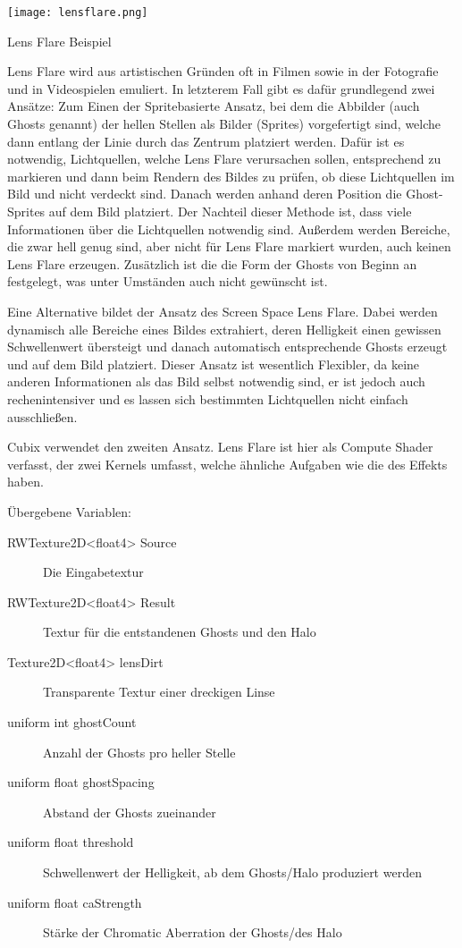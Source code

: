 \texttt{[image: lensflare.png]}
\caption{Lens Flare Beispiel}
\label{img:lensFlareImg}

Lens Flare wird aus artistischen Gründen oft in Filmen sowie in der Fotografie und in Videospielen emuliert. In letzterem Fall gibt es dafür grundlegend zwei Ansätze: Zum Einen der Spritebasierte Ansatz, bei dem die Abbilder (auch Ghosts genannt) der hellen Stellen als Bilder (Sprites) vorgefertigt sind, welche dann entlang der Linie durch das Zentrum platziert werden. Dafür ist es notwendig, Lichtquellen, welche Lens Flare verursachen sollen, entsprechend zu markieren und dann beim Rendern des Bildes zu prüfen, ob diese Lichtquellen im Bild und nicht verdeckt sind. Danach werden anhand deren Position die Ghost-Sprites auf dem Bild platziert. Der Nachteil dieser Methode ist, dass viele Informationen über die Lichtquellen notwendig sind. Au{\ss}erdem werden Bereiche, die zwar hell genug sind, aber nicht für Lens Flare markiert wurden, auch keinen Lens Flare erzeugen. Zusätzlich ist die die Form der Ghosts von Beginn an festgelegt, was unter Umständen auch nicht gewünscht ist.

Eine Alternative bildet der Ansatz des Screen Space Lens Flare. Dabei werden dynamisch alle Bereiche eines Bildes extrahiert, deren Helligkeit einen gewissen Schwellenwert übersteigt und danach automatisch entsprechende Ghosts erzeugt und auf dem Bild platziert. Dieser Ansatz ist wesentlich Flexibler, da keine anderen Informationen als das Bild selbst notwendig sind, er ist jedoch auch rechenintensiver und es lassen sich bestimmten Lichtquellen nicht einfach ausschlie{\ss}en.

Cubix verwendet den zweiten Ansatz. Lens Flare ist hier als Compute Shader verfasst, der zwei Kernels umfasst, welche ähnliche Aufgaben wie die des  Effekts haben. 

Übergebene Variablen:
\begin{description}
\item[RWTexture2D<float4> Source] Die Eingabetextur
\item[RWTexture2D<float4> Result] Textur für die entstandenen Ghosts und den Halo
\item[Texture2D<float4> lensDirt] Transparente Textur einer dreckigen Linse
\item[uniform int ghostCount] Anzahl der Ghosts pro heller Stelle
\item[uniform float ghostSpacing] Abstand der Ghosts zueinander
\item[uniform float threshold] Schwellenwert der Helligkeit, ab dem Ghosts/Halo produziert werden
\item[uniform float caStrength] Stärke der Chromatic Aberration der Ghosts/des Halo
\end{description}

